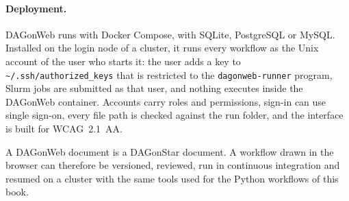 \paragraph{Deployment.} DAGonWeb runs with Docker Compose, with SQLite,
PostgreSQL or MySQL. Installed on the login node of a cluster, it runs every
workflow as the Unix account of the user who starts it: the user adds a key to
\texttt{\~{}/.ssh/authorized\_keys} that is restricted to the
\texttt{dagonweb-runner} program, Slurm jobs are submitted as that user, and
nothing executes inside the DAGonWeb container. Accounts carry roles and
permissions, sign-in can use single sign-on, every file path is checked
against the run folder, and the interface is built for WCAG~2.1~AA.

\begin{practicebox}
A DAGonWeb document is a DAGonStar document. A workflow drawn in the browser
can therefore be versioned, reviewed, run in continuous integration and
resumed on a cluster with the same tools used for the Python workflows of
this book.
\end{practicebox}
